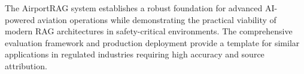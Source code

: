 The AirportRAG system establishes a robust foundation for advanced AI-powered aviation operations while demonstrating the practical viability of modern RAG architectures in safety-critical environments. The comprehensive evaluation framework and production deployment provide a template for similar applications in regulated industries requiring high accuracy and source attribution.
